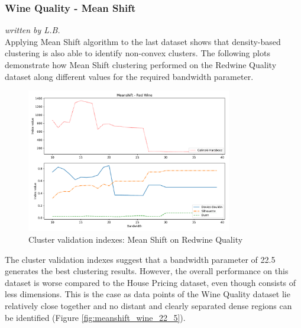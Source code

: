 \subsubsection{Wine Quality - Mean Shift}
\textit{written by L.B.}\\

Applying Mean Shift algorithm to the last dataset shows that density-based clustering is also able to identify non-convex clusters. The following plots demonstrate how Mean Shift clustering performed on the Redwine Quality dataset along different values for the required bandwidth parameter.

\begin{figure}[H]
\begin{center}
\includegraphics[width=0.8\textwidth]{images/Meanshift_-_Red_Wine.pdf}
\caption{Cluster validation indexes: Mean Shift on Redwine Quality}
\end{center}
\label{fig:meanshift_wine_indexes}
\end{figure}

The cluster validation indexes suggest that a bandwidth parameter of 22.5 generates the best clustering results. However, the overall performance on this dataset is worse compared to the House Pricing dataset, even though consists of less dimensions. This is the case as data points of the Wine Quality dataset lie relatively close together and no distant and clearly separated dense regions can be identified (Figure \ref{fig:meanshift_wine_22_5}). 

